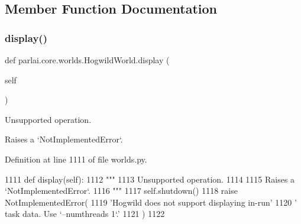 \subsection{Member Function Documentation}
\mbox{\label{classparlai_1_1core_1_1worlds_1_1HogwildWorld_a1b7aed0a7b56712f22ee8b04c65d7c00}} 
\subsubsection{\texorpdfstring{display()}{display()}}
{\footnotesize\ttfamily def parlai.\+core.\+worlds.\+Hogwild\+World.\+display (\begin{DoxyParamCaption}\item[{}]{self }\end{DoxyParamCaption})}

\begin{DoxyVerb}Unsupported operation.

Raises a `NotImplementedError`.
\end{DoxyVerb}
 

Definition at line 1111 of file worlds.\+py.


\begin{DoxyCode}
1111     \textcolor{keyword}{def }display(self):
1112         \textcolor{stringliteral}{"""}
1113 \textcolor{stringliteral}{        Unsupported operation.}
1114 \textcolor{stringliteral}{}
1115 \textcolor{stringliteral}{        Raises a `NotImplementedError`.}
1116 \textcolor{stringliteral}{        """}
1117         self.shutdown()
1118         \textcolor{keywordflow}{raise} NotImplementedError(
1119             \textcolor{stringliteral}{'Hogwild does not support displaying in-run'}
1120             \textcolor{stringliteral}{' task data. Use `--numthreads 1`.'}
1121         )
1122 
\end{DoxyCode}
\mbox{\label{classparlai_1_1core_1_1worlds_1_1HogwildWorld_a0425099fbc33cb97d6fbe67dbd2e8a1f}} 
